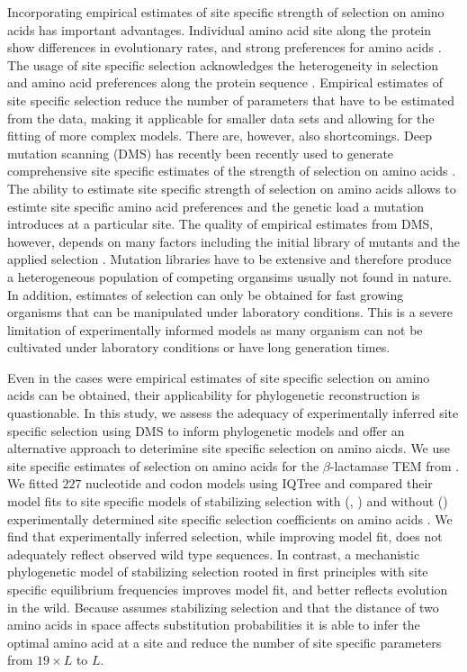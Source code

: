 \documentclass[12pt]{article}
\begin{document}
Incorporating empirical estimates of site specific strength of selection on amino acids has important advantages.
Individual amino acid site along the protein show differences in evolutionary rates, and strong preferences for amino acids \citep{HalpernAndBruno1998, ashenberg2013, echave2016}.
The usage of site specific selection acknowledges the heterogeneity in selection and amino acid preferences along the protein sequence \citep{hilton2017}.
Empirical estimates of site specific selection reduce the number of parameters that have to be estimated from the data, making it applicable for smaller data sets and allowing for the fitting of more complex models.
There are, however, also shortcomings.
Deep mutation scanning (DMS) has recently been recently used to generate comprehensive site specific estimates of the strength of selection on amino acids \citep{Fowler2014}.
The ability to estimate site specific strength of selection on amino acids allows to estimte site specific amino acid preferences and the genetic load a mutation introduces at a particular site\citep{bloom2014,firnberg2014,stiffler2016}.
The quality of empirical estimates from DMS, however, depends on many factors including the initial library of mutants and the applied selection \citep{FirnbergAndOstermeier2012}.
Mutation libraries have to be extensive and therefore produce a heterogeneous population of competing organsims usually not found in nature.
In addition, estimates of selection can only be obtained for fast growing organisms that can be manipulated under laboratory conditions.
This is a severe limitation of experimentally informed models as many organism can not be cultivated under laboratory conditions or have long generation times.

Even in the cases were empirical estimates of site specific selection on amino acids can be obtained, their applicability for phylogenetic reconstruction is quastionable.
In this study, we assess the adequacy of experimentally inferred site specific selection using DMS to inform phylogenetic models and offer an alternative approach to deterimine site specific selection on amino aicds.
We use site specific estimates of selection on amino acids for the $\beta$-lactamase TEM from \citet{stiffler2016}.
We fitted $227$ nucleotide and codon models using IQTree and compared their model fits to site specific models of stabilizing selection with (\phydms, \selacDMS) and without (\selac) experimentally determined site specific selection coefficients on amino acids \citep{nguyen2015,hilton2017,beaulieu2018}.
We find that experimentally inferred selection, while improving model fit, does not adequately reflect observed wild type sequences.
In contrast, \selac \citep{beaulieu2018} a mechanistic phylogenetic model of stabilizing selection rooted in first principles with site specific equilibrium frequencies improves model fit, and better reflects evolution in the wild.
Because \selac assumes stabilizing selection and that the distance of two amino acids in \PC space affects substitution probabilities it is able to infer the optimal amino acid at a site and reduce the number of site specific parameters from $19\times L$ to $L$.
\end{document}
